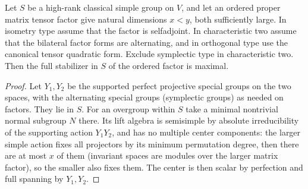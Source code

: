 \begin{proposition}\label{fa:ordered-factor-maximal}
Let \(S\) be a high-rank classical simple group on \(V\), and let an ordered proper matrix tensor factor
give natural dimensions \(x<y\), both sufficiently large.  In isometry type assume that the factor is
selfadjoint.  In characteristic two assume that the bilateral factor forms are alternating, and in
orthogonal type use the canonical tensor quadratic form.  Exclude symplectic type in characteristic two.
Then the full stabilizer in \(S\) of the ordered factor is maximal.
\end{proposition}

\begin{proof}

Let \(Y_1,Y_2\) be the supported perfect projective special groups on the
two spaces, with the alternating special groups (symplectic groups) as needed on factors. They lie in
\(S\). For an overgroup within \(S\) take a minimal nontrivial normal subgroup \(N\) there. Its lift
algebra is semisimple by absolute irreducibility of the supporting action \(Y_1Y_2\), and has no multiple
center components: the larger simple action fixes all projectors by its minimum permutation degree, then
there are at most \(x\) of them (invariant spaces are modules over the larger matrix factor), so the
smaller also fixes them. The center is then scalar by perfection and full spanning by \(Y_1,Y_2\).


\end{proof}
